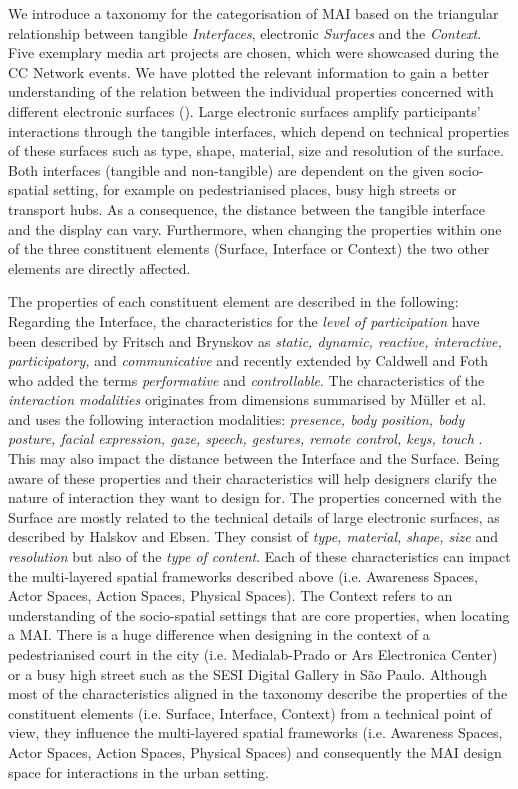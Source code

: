 We introduce a taxonomy for the categorisation of MAI based on the triangular relationship between tangible \textit{Interfaces}, electronic \textit{Surfaces} and the \textit{Context}. Five exemplary media art projects are chosen, which were showcased during the CC Network events.
We have plotted the relevant information to gain a better understanding of the relation between the individual properties concerned with different electronic surfaces (\label{fig:CCN_Taxonomy}).
Large electronic surfaces amplify participants’ interactions through the tangible interfaces, which depend on technical properties of these surfaces such as type, shape, material, size and resolution of the surface. Both interfaces (tangible and non-tangible) are dependent on the given socio-spatial setting, for example on pedestrianised places, busy high streets or transport hubs. 
As a consequence, the distance between the tangible interface and the display can vary. 
Furthermore, when changing the properties within one of the three constituent elements (Surface, Interface or Context) the two other elements are directly affected. 

The properties of each constituent element are described in the following: Regarding the Interface, the characteristics for the \textit{level of participation} have been described by Fritsch and Brynskov as \textit{static, dynamic, reactive, interactive, participatory,} and \textit{communicative} and recently extended by Caldwell and Foth who added the terms \textit{performative} and \textit{controllable}.
The characteristics of the \textit{interaction modalities} originates from dimensions summarised by Müller et al. and uses the following interaction modalities: \textit{presence, body position, body posture, facial expression, gaze, speech, gestures, remote control, keys, touch} . 
This may also impact the distance between the Interface and the Surface. 
Being aware of these properties and their characteristics will help designers clarify the nature of interaction they want to design for.
The properties concerned with the Surface are mostly related to the technical details of large electronic surfaces, as described by Halskov and Ebsen.
They consist of \textit{type, material, shape, size} and \textit{resolution} but also of the \textit{type of content}. 
Each of these characteristics can impact the multi-layered spatial frameworks described above (i.e. Awareness Spaces, Actor Spaces, Action Spaces, Physical Spaces).
The Context refers to an understanding of the socio-spatial settings that are core properties, when locating a MAI. 
There is a huge difference when designing in the context of a pedestrianised court in the city (i.e. Medialab-Prado or Ars Electronica Center) or a busy high street such as the SESI Digital Gallery in São Paulo.
Although most of the characteristics aligned in the taxonomy describe the properties of the constituent elements (i.e. Surface, Interface, Context) from a technical point of view, they influence the multi-layered spatial frameworks (i.e. Awareness Spaces, Actor Spaces, Action Spaces, Physical Spaces) and consequently the MAI design space for interactions in the urban setting. 


